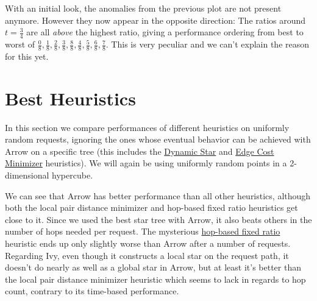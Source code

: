 \documentclass[a4paper, oneside]{discothesis}
\begin{document}
With an initial look, the anomalies from the previous plot are not present anymore. However they now appear in the opposite direction: The ratios around $t=\frac{3}{4}$ are all \textit{above} the highest ratio, giving a performance ordering from best to worst of $\frac{0}{8}, \frac{1}{8}, \frac{2}{8}, \frac{3}{8}, \frac{8}{8}, \frac{4}{8}, \frac{5}{8}, \frac{6}{8}, \frac{7}{8}$. This is very peculiar and we can't explain the reason for this yet.

\section{Best Heuristics}\label{result:algs}

In this section we compare performances of different heuristics on uniformly random requests, ignoring the ones whose eventual behavior can be achieved with Arrow on a specific tree (this includes the \hyperref[alg:dynstar]{Dynamic Star} and \hyperref[alg:ecm]{Edge Cost Minimizer} heuristics). We will again be using uniformly random points in a 2-dimensional hypercube.


We can see that Arrow has better performance than all other heuristics, although both the local pair distance minimizer and hop-based fixed ratio heuristics get close to it. Since we used the best star tree with Arrow, it also beats others in the number of hops needed per request. The mysterious \hyperref[alg:frh]{hop-based fixed ratio} heuristic ends up only slightly worse than Arrow after a number of requests. Regarding Ivy, even though it constructs a local star on the request path, it doesn't do nearly as well as a global star in Arrow, but at least it's better than the local pair distance minimizer heuristic which seems to lack in regards to hop count, contrary to its time-based performance.
\end{document}
